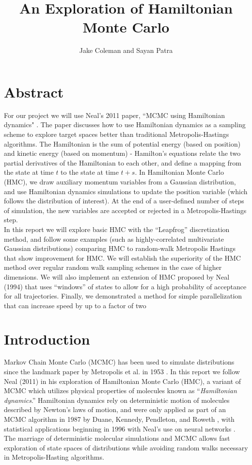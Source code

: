 \documentclass{article}
\title{An Exploration of Hamiltonian Monte Carlo}
\author{Jake Coleman and Sayan Patra}
\date{}
\numberwithin{equation}{section}
\begin{document}
\maketitle

\section{Abstract}
For our project we will use Neal's 2011 paper, ``MCMC using Hamiltonian dynamics" \cite{main}. The paper discusses how to use Hamiltonian dynamics as a sampling scheme to explore target spaces better than traditional Metropolis-Hastings algorithms. The Hamiltonian is the sum of potential energy (based on position) and kinetic energy (based on momentum) - Hamilton's equations relate the two partial derivatives of the Hamiltonian to each other, and define a mapping from the state at time $t$ to the state at time $t + s$. In Hamiltonian Monte Carlo (HMC), we draw auxiliary momentum variables from a Gaussian distribution, and use Hamiltonian dynamics simulations to update the position variable (which follows the distribution of interest). At the end of a user-defined number of steps of simulation, the new variables are accepted or rejected in a Metropolis-Hastings step.\\

In this report we will explore basic HMC with the ``Leapfrog'' discretization method, and follow some examples (such as highly-correlated multivariate Gaussian distributions) comparing HMC to random-walk Metropolis Hastings that show improvement for HMC. We will establish the superiority of the HMC method over regular random walk sampling schemes in the case of higher dimensions. We will also implement an extension of HMC proposed by Neal (1994) that uses ``windows'' of states to allow for a high probability of acceptance for all trajectories. Finally, we demonstrated a method for simple parallelization that can increase speed by up to a factor of two

\section{Introduction}
Markov Chain Monte Carlo (MCMC) has been used to simulate distributions since the landmark paper by Metropolis et al. in 1953 \cite{metrop}. In this report we follow Neal (2011) \cite{main} in his exploration of Hamiltonian Monte Carlo (HMC), a variant of MCMC which utilizes physical properties of molecules known as ``\textit{Hamiltonian dynamics}.'' Hamiltonian dynamics rely on deterministic motion of molecules described by Newton's laws of motion, and were only applied as part of an MCMC algorithm in 1987 by Duane, Kennedy, Pendleton, and Roweth \cite{og_hmc}, with statistical applications beginning in 1996 with Neal's use on neural networks \cite{neural}.  The marriage of deterministic molecular simulations and MCMC allows fast exploration of state spaces of distributions while avoiding random walks necessary in Metropolis-Hasting algorithms.\\
\end{document}
